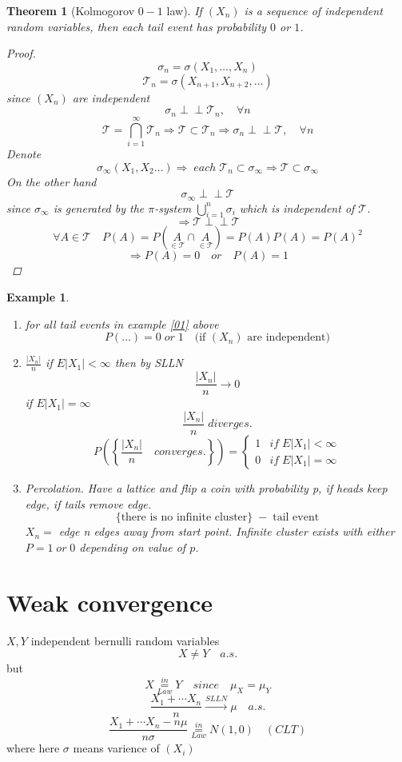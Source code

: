\documentclass[12pt]{article}
\newcommand{\Perp}{\perp \! \! \! \perp}
\newtheorem{theorem}{Theorem}[section]
\newtheorem{example}{Example}[section]
\begin{document}
\begin{theorem}[Kolmogorov $0-1$ law]\label{kol01}
If $(X_n)$ is a sequence of independent random variables, then each tail event has probability $0$ or $1$.
\begin{proof}
\[\sigma_n=\sigma(X_1, \dots , X_n)\]
\[\mathcal{T}_n = \sigma(X_{n+1},X_{n+2},  \dots )\]
since $(X_n)$ are independent 
\[\sigma_n \Perp  \mathcal{T}_n, \quad \forall n\]
\[\mathcal{T} = \bigcap_{i=1}^{\infty}\mathcal{T}_n \Rightarrow \mathcal{T} \subset \mathcal{T}_n \Rightarrow \sigma_n \Perp  \mathcal{T}, \quad \forall n\]
Denote 
\[\sigma_{\infty}(X_1, X_2 \dots ) \Rightarrow \; each\; \mathcal{T}_n \subset \sigma_{\infty} \Rightarrow \mathcal{T} \subset \sigma_{\infty}\]
On the other hand 
\[\sigma_{\infty} \Perp  \mathcal{T}\]
since $\sigma_{\infty}$ is generated by the $\pi$-system $\bigcup_{i=1}^{n}\sigma_i$ which is independent of $\mathcal{T}$.
\[\Rightarrow \mathcal{T} \Perp \mathcal{T}\]
\[\forall A \in \mathcal{T} \quad P(A)=P(\underset{\in \mathcal{T}}{A}\cap \underset{\in \mathcal{T}}{A})= P(A)P(A) = P(A)^2\]
\[\Rightarrow P(A) = 0 \quad or \quad P(A)=1\]
\end{proof}
\end{theorem}

\begin{example}\quad\\
\begin{enumerate}
\item for all tail events in example \ref{01} above \[P(\dots) = 0\;or \;1\quad \text{(if $(X_n)$ are independent)}\]
\item $\frac{|X_n|}{n}$ if $E|X_1| < \infty$ then by SLLN \[\frac{|X_n|}{n} \rightarrow 0\]
if  $E|X_1| = \infty$
\[\frac{|X_n|}{n} \; diverges.\]
\[P\left(\left\{\frac{|X_n|}{n} \quad converges.\right\}\right) = \begin{cases} 1 &if \; E|X_1| < \infty\\ 0 &if \; E|X_1| = \infty\end{cases}\]
\item Percolation. Have a lattice and flip a coin with probability p, if heads keep edge, if tails remove edge.
\[\{\text{there is no infinite cluster}\}  \; -  \; \text{tail event} \]
$X_n =$ edge n edges away from start point. Infinite cluster exists with either $P=1 \; or \; 0$ depending on value of $p$. 
\end{enumerate}
\end{example}

\section{Weak convergence}
$X,Y$ independent bernulli random variables 
\[X \neq Y\quad a.s.\]
but
\[X\overset{in}{\underset{Law}{=}} Y\quad since \quad \mu_X = \mu_Y\]
\[\frac{X_1+ \cdots X_n}{n} \overset{SLLN}{\rightarrow} \mu \quad a.s.\]
\[\frac{X_1+ \cdots X_n - n\mu}{n\sigma}\overset{in}{\underset{Law}{=}} N(1,0) \quad (CLT) \] 
where here $\sigma$ means varience of $(X_i)$
\end{document}
